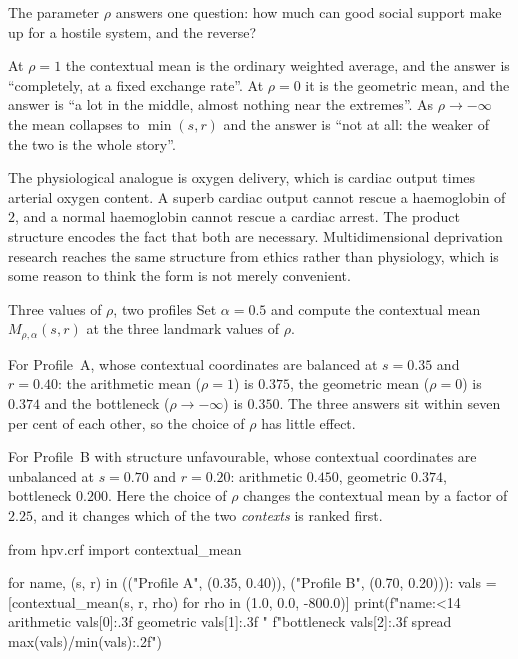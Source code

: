 \begin{reading}
The parameter $\rho$ answers one question: how much can good social support
make up for a hostile system, and the reverse?

At $\rho=1$ the contextual mean is the ordinary weighted average, and the
answer is ``completely, at a fixed exchange rate''. At $\rho=0$ it is the
geometric mean, and the answer is ``a lot in the middle, almost nothing near
the extremes''. As $\rho\to-\infty$ the mean collapses to $\min(s,r)$ and the
answer is ``not at all: the weaker of the two is the whole story''.

The physiological analogue is oxygen delivery, which is cardiac output times
arterial oxygen content. A superb cardiac output cannot rescue a haemoglobin of
$2$, and a normal haemoglobin cannot rescue a cardiac arrest. The product
structure encodes the fact that both are necessary. Multidimensional
deprivation research reaches the same structure from ethics rather than
physiology, which is some reason to think the form is not merely convenient.
\end{reading}

\begin{workedexample}{Three values of $\rho$, two profiles}
Set $\alpha=0.5$ and compute the contextual mean $M_{\rho,\alpha}(s,r)$ at the
three landmark values of $\rho$.

For Profile~A, whose contextual coordinates are balanced at $s=0.35$ and
$r=0.40$: the arithmetic mean ($\rho=1$) is $0.375$, the geometric mean
($\rho=0$) is $0.374$ and the bottleneck ($\rho\to-\infty$) is $0.350$. The
three answers sit within seven per cent of each other, so the choice of $\rho$
has little effect.

For Profile~B with structure unfavourable, whose contextual coordinates are
unbalanced at $s=0.70$ and $r=0.20$: arithmetic $0.450$, geometric $0.374$,
bottleneck $0.200$. Here the choice of $\rho$ changes the contextual mean by a
factor of $2.25$, and it
changes which of the two \emph{contexts} is ranked first.

\begin{wecode}[Python]
from hpv.crf import contextual_mean

for name, (s, r) in (("Profile A", (0.35, 0.40)), ("Profile B", (0.70, 0.20))):
    vals = [contextual_mean(s, r, rho) for rho in (1.0, 0.0, -800.0)]
    print(f"{name:<14} arithmetic {vals[0]:.3f}  geometric {vals[1]:.3f}  "
          f"bottleneck {vals[2]:.3f}  spread {max(vals)/min(vals):.2f}")
\end{wecode}

\end{workedexample}

